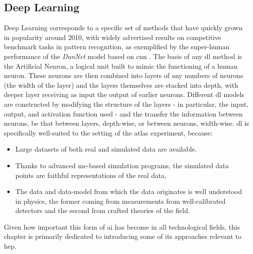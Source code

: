 \subsection{Deep Learning} 
Deep Learning corresponds to a specific set of methods that have quickly grown in popularity around 2010, with widely advertised results on competitive benchmark tasks in pattern recognition, as exemplified by the super-human performance of the \textit{DanNet} \cite{DanNet} model based on \gls{cnn} \cite{NIPS198953c3bce6}. The basis of any \gls{dl} method is the Artificial Neuron, a logical unit built to mimic the functioning of a human neuron. These neurons are then combined into layers of any numbers of neurons (the width of the layer) and the layers themselves are stacked into depth, with deeper layer receiving as input the output of earlier neurons. Different \gls{dl} models are constructed by modifying the structure of the layers - in particular, the input, output, and activation function used - and the transfer the information between neurons, be that between layers, depth-wise, or between neurons, width-wise. \gls{dl} is specifically well-suited to the setting of the \gls{atlas} experiment, because:
\begin{itemize}
    \item Large datasets of both real and simulated data are available.
    \item Thanks to advanced \gls{mc}-based simulation programs, the simulated data points are faithful representations of the real data,
    \item The data and data-model from which the data originates is well understood in physics, the former coming from measurements from well-calibrated detectors and the second from crafted theories of the field. 
\end{itemize}
Given how important this form of \gls{ai} has become in all technological fields, this chapter is primarily dedicated to introducing some of its approaches relevant to \gls{hep}. 

